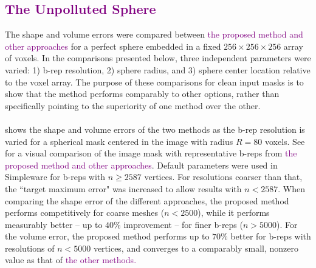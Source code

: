 \subsection{\textcolor{purple}{The Unpolluted Sphere}}
\label{The Unpolluted Sphere}

The shape and volume errors were compared between \textcolor{purple}{the proposed method and other approaches} for a perfect sphere embedded in a fixed $256 \times 256 \times 256$ array of voxels.  In the comparisons presented below, three independent parameters were varied:  1) b-rep resolution, 2) sphere radius, and 3) sphere center location relative to the voxel array. The purpose of these comparisons for clean input masks is to show that the method performs comparably to other options, rather than specifically pointing to the superiority of one method over the other. \\ \\
%
 shows the shape and volume errors of the two methods as the b-rep resolution is varied for a spherical mask centered in the image with radius $R = 80$ voxels. See~ for a visual comparison of the image mask with representative b-reps from \textcolor{purple}{the proposed method and other approaches}. Default parameters were used in Simpleware for b-reps with $n \ge 2587$ vertices. For resolutions coarser than that, the ``target maximum error" was increased to allow results with $n < 2587$. When comparing the shape error of the different approaches, the proposed method performs competitively for coarse meshes ($n < 2500$), while it performs measurably better -- up to $40\%$ improvement -- for finer b-reps ($n > 5000$). For the volume error, the proposed method performs up to $70\%$ better for b-reps with resolutions of $n < 5000$ vertices, and converges to a comparably small, nonzero value as that of \textcolor{purple}{the other methods.}

